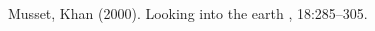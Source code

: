\documentclass[DIV=calc, paper=a4, fontsize=11pt, twocolumn]{scrartcl}	 %
\begin{document}

\begin{thebibliography}{99} %

\bibitem[Cambridge, 2000]{}
Musset, Khan (2000).
\newblock Looking into the earth
, 18:285--305.
 
\end{thebibliography}

\end{document}
